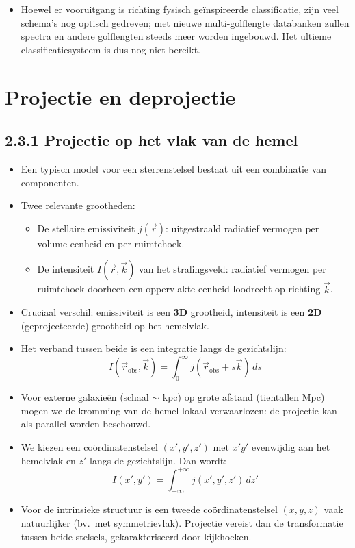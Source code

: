 \documentclass[10pt,a4paper]{article}
\renewenvironment{equation}{\begin{equation*}}{\end{equation*}}
\begin{document}
\begin{itemize}
  \item Hoewel er vooruitgang is richting fysisch geïnspireerde classificatie, zijn veel schema’s nog optisch gedreven; met nieuwe multi-golflengte databanken zullen spectra en andere golflengten steeds meer worden ingebouwd. Het ultieme classificatiesysteem is dus nog niet bereikt.
\end{itemize}
\section*{Projectie en deprojectie}
\subsection*{2.3.1 Projectie op het vlak van de hemel}
\begin{itemize}
  \item Een typisch model voor een sterrenstelsel bestaat uit een combinatie van componenten. 
  \item Twee relevante grootheden:
  \begin{itemize}
    \item De stellaire emissiviteit $j(\vec{r})$: uitgestraald radiatief vermogen per volume-eenheid en per ruimtehoek.
    \item De intensiteit $I(\vec{r},\vec{k})$ van het stralingsveld: radiatief vermogen per ruimtehoek doorheen een oppervlakte-eenheid loodrecht op richting $\vec{k}$.
  \end{itemize}
  \item Cruciaal verschil: emissiviteit is een \textbf{3D} grootheid, intensiteit is een \textbf{2D} (geprojecteerde) grootheid op het hemelvlak.
  \item Het verband tussen beide is een integratie langs de gezichtslijn:
  \begin{equation}
    I(\vec{r}_{\mathrm{obs}},\vec{k}) = \int_{0}^{\infty} j(\vec{r}_{\mathrm{obs}} + s\vec{k})\,ds
    \tag{2.13}
  \end{equation}
  \item Voor externe galaxieën (schaal $\sim$ kpc) op grote afstand (tientallen Mpc) mogen we de kromming van de hemel lokaal verwaarlozen: de projectie kan als parallel worden beschouwd.
  \item We kiezen een coördinatenstelsel $(x',y',z')$ met $x'y'$ evenwijdig aan het hemelvlak en $z'$ langs de gezichtslijn. Dan wordt:
  \begin{equation}
    I(x',y') = \int_{-\infty}^{+\infty} j(x',y',z')\,dz'
    \tag{2.14}
  \end{equation}

  \item Voor de intrinsieke structuur is een tweede coördinatenstelsel $(x,y,z)$ vaak natuurlijker (bv.\ met symmetrievlak). Projectie vereist dan de transformatie tussen beide stelsels, gekarakteriseerd door kijkhoeken.

\end{itemize}
\end{document}
